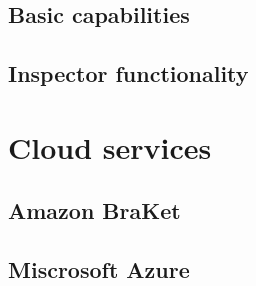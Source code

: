 \subsection{Basic capabilities}

\subsection{Inspector functionality}





\section{Cloud services}

\subsection{Amazon BraKet}

\subsection{Miscrosoft Azure}
